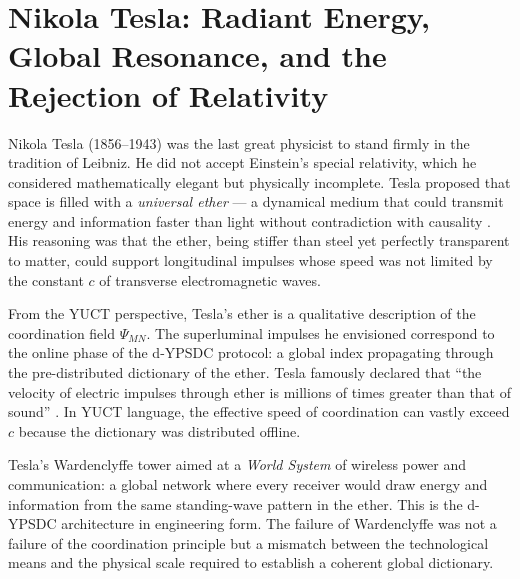 \documentclass[12pt,a4paper]{article}
\begin{document}
	\section{Nikola Tesla: Radiant Energy, Global Resonance, and the Rejection of Relativity}
	
	Nikola Tesla (1856–1943) was the last great physicist to stand firmly in the tradition of Leibniz. He did not accept Einstein's special relativity, which he considered mathematically elegant but physically incomplete. Tesla proposed that space is filled with a \emph{universal ether} --- a dynamical medium that could transmit energy and information faster than light without contradiction with causality \cite{Tesla1932}. His reasoning was that the ether, being stiffer than steel yet perfectly transparent to matter, could support longitudinal impulses whose speed was not limited by the constant \(c\) of transverse electromagnetic waves.
	
	From the YUCT perspective, Tesla's ether is a qualitative description of the coordination field \(\Psi_{MN}\). The superluminal impulses he envisioned correspond to the online phase of the d-YPSDC protocol: a global index propagating through the pre-distributed dictionary of the ether. Tesla famously declared that ``the velocity of electric impulses through ether is millions of times greater than that of sound'' \cite{Tesla1907}. In YUCT language, the effective speed of coordination can vastly exceed \(c\) because the dictionary was distributed offline.
	
	Tesla's Wardenclyffe tower aimed at a \emph{World System} of wireless power and communication: a global network where every receiver would draw energy and information from the same standing-wave pattern in the ether. This is the d-YPSDC architecture in engineering form. The failure of Wardenclyffe was not a failure of the coordination principle but a mismatch between the technological means and the physical scale required to establish a coherent global dictionary.
	
\end{document}
